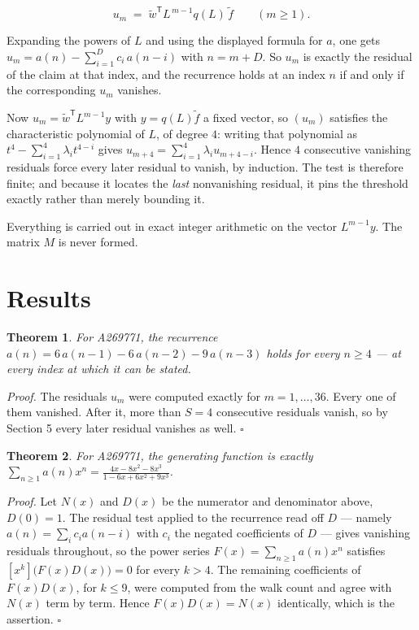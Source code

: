 \documentclass[11pt]{article}
\newtheorem{theorem}{Theorem}
\theoremstyle{definition}
\begin{document}
\[u_m \;=\; \tilde w^{\mathsf T} L^{\,m-1} q(L)\,\tilde f \qquad (m \ge 1).\]

Expanding the powers of $L$ and using the displayed formula for $a$, one gets $u_m = a(n) - \sum_{i=1}^{D} c_i\,a(n-i)$ with $n = m + D$. So $u_m$ is exactly the residual of the claim at that index, and the recurrence holds at an index $n$ if and only if the corresponding $u_m$ vanishes.

Now $u_m = \tilde w^{\mathsf T} L^{m-1} y$ with $y = q(L)\tilde f$ a fixed vector, so $(u_m)$ satisfies the characteristic polynomial of $L$, of degree $4$: writing that polynomial as $t^{4} - \sum_{i=1}^{4} \lambda_i t^{4-i}$ gives $u_{m+4} = \sum_{i=1}^{4} \lambda_i u_{m+4-i}$. Hence $4$ consecutive vanishing residuals force every later residual to vanish, by induction. The test is therefore finite; and because it locates the {\itshape last} nonvanishing residual, it pins the threshold exactly rather than merely bounding it.

Everything is carried out in exact integer arithmetic on the vector $L^{m-1}y$. The matrix $M$ is never formed.

\section{Results}

\begin{theorem} For A269771, the recurrence $a(n) = 6\,a(n-1) - 6\,a(n-2) - 9\,a(n-3)$ holds for every $n \ge 4$ --- at every index at which it can be stated.\end{theorem}

{\itshape Proof.} The residuals $u_m$ were computed exactly for $m = 1,\dots,36$. Every one of them vanished. After it, more than $S = 4$ consecutive residuals vanish, so by Section 5 every later residual vanishes as well. $\square$

\begin{theorem} For A269771, the generating function is exactly $\sum_{n\ge 1} a(n)x^n = \frac{4x - 8x^{2} - 8x^{3}}{1 - 6x + 6x^{2} + 9x^{3}}$.\end{theorem}

{\itshape Proof.} Let $N(x)$ and $D(x)$ be the numerator and denominator above, $D(0)=1$. The residual test applied to the recurrence read off $D$ --- namely $a(n) = \sum_i c_i a(n-i)$ with $c_i$ the negated coefficients of $D$ --- gives vanishing residuals throughout, so the power series $F(x)=\sum_{n\ge 1}a(n)x^n$ satisfies $[x^k]\bigl(F(x)D(x)\bigr) = 0$ for every $k > 4$. The remaining coefficients of $F(x)D(x)$, for $k \le 9$, were computed from the walk count and agree with $N(x)$ term by term. Hence $F(x)D(x) = N(x)$ identically, which is the assertion. $\square$
\end{document}
